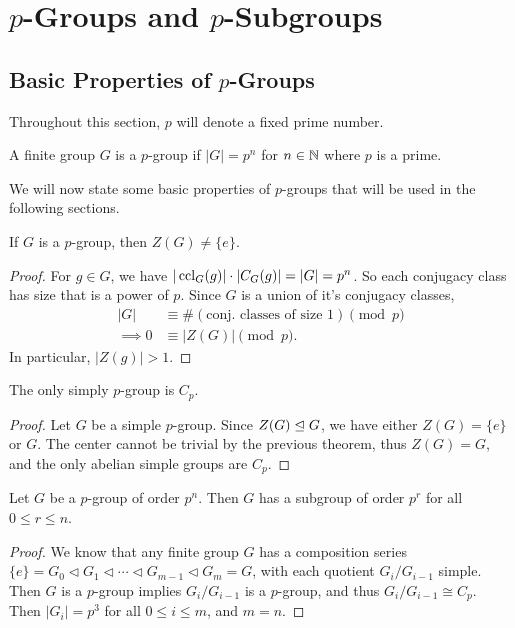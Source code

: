 \documentclass[a4paper]{scrartcl}
\begin{document}
\section{$p$-Groups and $p$-Subgroups}

\subsection{Basic Properties of $p$-Groups}

Throughout this section, $p$ will denote a fixed prime number.

\begin{definition}[$p$-group]
	A finite group $G$ is a $p$-group if $|G| = p^n$ for $n \in \mathbb{N}$ where $p$ is a prime.
\end{definition}


We will now state some basic properties of $p$-groups that will be used in the following sections.

\begin{theorem}
	If $G$ is a $p$-group, then $Z(G) \neq \{e\}$.
\end{theorem}
\begin{proof}
	For $g \in G$, we have $|\operatorname{ccl}_G(g)| \cdot |C_G(g)| = |G| = p^n$. So each conjugacy class has size that is a power of $p$. 
	Since $G$ is a union of it's conjugacy classes, 
	\begin{align*}
		|G| &\equiv \#(\text{conj. classes of size 1}) \pmod{p}  \\
\implies 0 &\equiv |Z(G)| \pmod{p}.
	\end{align*}
	In particular, $|Z(g)| > 1$.
\end{proof}

\begin{corollary}
	The only simply $p$-group is $C_p$.
\end{corollary}
\begin{proof}
	Let $G$ be a simple $p$-group. Since $Z(G) \trianglelefteq G$, we have either $Z(G) = \{e\}$ or $G$. The center cannot be trivial by the previous theorem, thus $Z(G) = G$, and the only abelian simple groups are $C_p$.
\end{proof}

\begin{corollary}
	Let $G$ be a $p$-group of order $p^n$. Then $G$ has a subgroup of order $p^r$ for all $0 \leq r \leq n$.
\end{corollary}
\begin{proof}
	We know that any finite group $G$ has a composition series $\{e\} = G_0 \triangleleft G_1 \triangleleft \cdots \triangleleft G_{m - 1} \triangleleft G_m = G$, with each quotient $G_i / G_{i - 1}$ simple. Then $G$ is a $p$-group implies $G_i/G_{i - 1}$ is a $p$-group, and thus $G_i/G_{i - 1} \cong C_p$. Then $|G_i| = p^3$ for all $0 \leq i \leq m$, and $m = n$. 
\end{proof}
\end{document}
